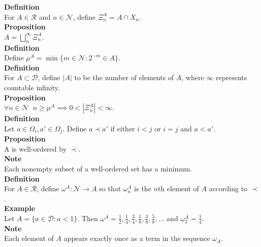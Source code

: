 \documentclass{article}
\newcommand{\targetset}{ \mathscr{R}}
\newcommand{\sourceset}{ \mathscr{D}}
\newcommand{\disjoints}{ X}
\newcommand{\naturals}{ \mathscr{N}}
\newcommand{\carpenter}{ \omega }
\newcommand{\elt}{a}
\newcommand{\intersector}{\Xi}
\newcommand{\interceptor}{\Omega}
\newcommand{\wed}{\mu}
\begin{document}
\textbf{Definition}\\
For $A \in \targetset$ and $ n \in \naturals$, define $\intersector^A_n = A \cap \disjoints_n$.\\

\textbf{Proposition}\\
$A = \bigsqcup_n^\infty \intersector^A_n$.\\

\textbf{Definition}\\
Define $\wed^A = \min \{ m \in \naturals : 2^{-m} \in A \}$. \\

\textbf{Definition}\\
For $A \subset \sourceset$, define $|A|$ to be the number of elements of $A$, where $\infty$ represents countable infinity.\\ 

\textbf{Proposition}\\
$\forall n \in \naturals \;\; n \ge \wed^A \implies 0 <  |\intersector^A_n| < \infty$.\\

\textbf{Definition}\\
Let $\elt \in \interceptor_i,  \elt' \in \interceptor_j$. Define $\elt \prec \elt'$ if either $i < j$ or $i = j$ and $\elt < \elt'$.\\

\textbf{Proposition}\\
A is well-ordered by $\prec.$\\

\textbf{Note}\\
Each nonempty subset of a well-ordered set has a minimum.\\ 

\textbf{Definition}\\
For $A \in \targetset$, define $\carpenter^A : \naturals \to A$ so that $\carpenter^A_n$ is the $n$th element of $A$ according to $\prec$.\\


\textbf{Example}\\
Let $A = \{ \elt \in \sourceset : \elt < 1 \}.$ Then $\carpenter^A = \frac{1}{2},\frac{1}{4},\frac{3}{4},\frac{1}{8},\frac{3}{8},\frac{5}{8}, ... $ and $\carpenter^A_2 = \frac{1}{4}$.\\

\textbf{Note}\\
Each element of $A$ appears exactly once as a term in the sequence $\carpenter_A$.\\
\end{document}
